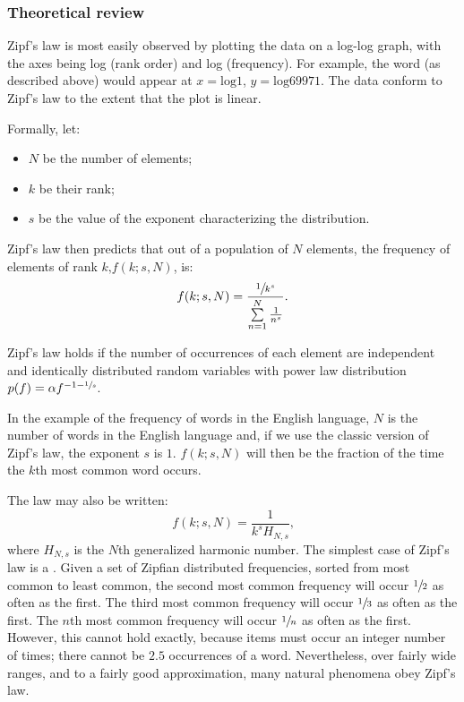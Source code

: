     \subsubsection{Theoretical review}

      Zipf's law is most easily observed by plotting the data on a log-log graph, with the axes being log (rank order) and log (frequency). For example, the word  (as described above) would appear at $x = \mbox{log}1$, $y = \mbox{log}69971$. The data conform to Zipf's law to the extent that the plot is linear.
      
      Formally, let:
      \begin{itemize}
        \item $N$ be the number of elements;
        \item $k$ be their rank;
        \item $s$ be the value of the exponent characterizing the distribution.
      \end{itemize}
      Zipf's law then predicts that out of a population of $N$ elements, the frequency of elements of rank $k\mbox{,} f(k;s,N)$, is:
      \begin{equation}
        f(k;s,N)=\frac{\sfrac{1}{k^s}}{\sum\limits_{n=1}^N \frac{1}{n^s}}\mbox{.}
      \end{equation}

      Zipf's law holds if the number of occurrences of each element are independent and identically distributed random variables with power law distribution $p(f) = \alpha f^{-1-\sfrac{1}{s}}$\cite{AdamicHuberman2002}.

      In the example of the frequency of words in the English language, $N$ is the number of words in the English language and, if we use the classic version of Zipf's law, the exponent $s$ is $1$. $f(k; s,N)$ will then be the fraction of the time the $k$th most common word occurs.

      The law may also be written:
      \begin{equation}
        f(k;s,N)=\frac{1}{k^s H_{N,s}}\mbox{,}
      \end{equation}
      where $H_{N,s}$ is the $N$th generalized harmonic number.
The simplest case of Zipf's law is a . Given a set of Zipfian distributed frequencies, sorted from most common to least common, the second most common frequency will occur $\sfrac{1}{2}$ as often as the first. The third most common frequency will occur $\sfrac{1}{3}$ as often as the first. The $n$th most common frequency will occur $\sfrac{1}{n}$ as often as the first. However, this cannot hold exactly, because items must occur an integer number of times; there cannot be $2.5$ occurrences of a word. Nevertheless, over fairly wide ranges, and to a fairly good approximation, many natural phenomena obey Zipf's law.

